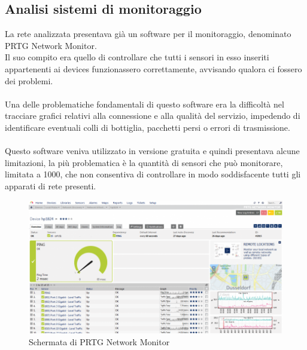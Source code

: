 \documentclass[Realizzazione.tex]{subfiles}
\begin{document}
\subsection{Analisi sistemi di monitoraggio}
La rete analizzata presentava già un software per il monitoraggio, denominato PRTG Network Monitor. \\
Il suo compito era quello di controllare che tutti i sensori in esso inseriti appartenenti ai devices funzionassero correttamente, avvisando qualora ci fossero dei problemi. \\\\
Una delle problematiche fondamentali di questo software era la difficoltà nel tracciare grafici relativi alla connessione e alla qualità del servizio, impedendo di identificare eventuali colli di bottiglia, pacchetti persi o errori di trasmissione. \\\\
Questo software veniva utilizzato in versione gratuita e quindi presentava alcune limitazioni, la più problematica è la quantità di sensori che può monitorare, limitata a 1000, che non consentiva di controllare in modo soddisfacente tutti gli apparati di rete presenti. \\

\begin{figure}[H]
	\centering
	\includegraphics[width=0.8\linewidth]{"images/PRTGStatistics"}
	\caption{Schermata di PRTG Network Monitor}
	\label{fig:Schermata di PRTG Network Monitor}
\end{figure}
\end{document}
